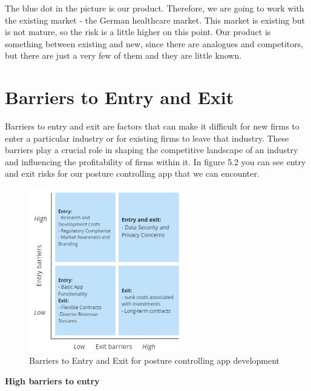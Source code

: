 The blue dot in the picture is our product. Therefore, we are going to work with the existing market - the German healthcare market. This market is existing but is not mature, so the risk is a little higher on this point. Our product is something between existing and new, since there are analogues and competitors, but there are just a very few of them and they are little known.

\section{Barriers to Entry and Exit}

Barriers to entry and exit are factors that can make it difficult for new firms to enter a particular industry or for existing firms to leave that industry. These barriers play a crucial role in shaping the competitive landscape of an industry and influencing the profitability of firms within it. In figure 5.2 you can see entry and exit risks for our posture controlling app that we can encounter. 

\begin{figure}[H]
	\centering
	\includegraphics[width=0.6\textwidth]{figures/barriers_to_entry_and_exit.png}
	\caption{Barriers to Entry and Exit for posture controlling app development}
	\label{fig:barriers_to_entry_and_exit}
\end{figure}

\textbf{High barriers to entry}

